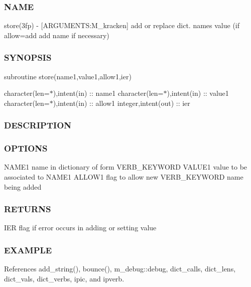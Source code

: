 \subsubsection*{N\+A\+ME}

store(3fp) -\/ \mbox{[}A\+R\+G\+U\+M\+E\+N\+TS\+:M\+\_\+kracken\mbox{]} add or replace dict. name\textquotesingle{}s value (if allow=\textquotesingle{}add\textquotesingle{} add name if necessary) \subsubsection*{S\+Y\+N\+O\+P\+S\+IS}

subroutine store(name1,value1,allow1,ier)

character(len=$\ast$),intent(in) \+:\+: name1 character(len=$\ast$),intent(in) \+:\+: value1 character(len=$\ast$),intent(in) \+:\+: allow1 integer,intent(out) \+:\+: ier

\subsubsection*{D\+E\+S\+C\+R\+I\+P\+T\+I\+ON}

\subsubsection*{O\+P\+T\+I\+O\+NS}

N\+A\+M\+E1 name in dictionary of form V\+E\+R\+B\+\_\+\+K\+E\+Y\+W\+O\+RD V\+A\+L\+U\+E1 value to be associated to N\+A\+M\+E1 A\+L\+L\+O\+W1 flag to allow new V\+E\+R\+B\+\_\+\+K\+E\+Y\+W\+O\+RD name being added

\subsubsection*{R\+E\+T\+U\+R\+NS}

I\+ER flag if error occurs in adding or setting value

\subsubsection*{E\+X\+A\+M\+P\+LE}

References add\+\_\+string(), bounce(), m\+\_\+debug\+::debug, dict\+\_\+calls, dict\+\_\+lens, dict\+\_\+vals, dict\+\_\+verbs, ipic, and ipverb.

\mbox{\label{namespacem__kracken_a9e2129d174220802486cc2dc7e0cc443}} 

